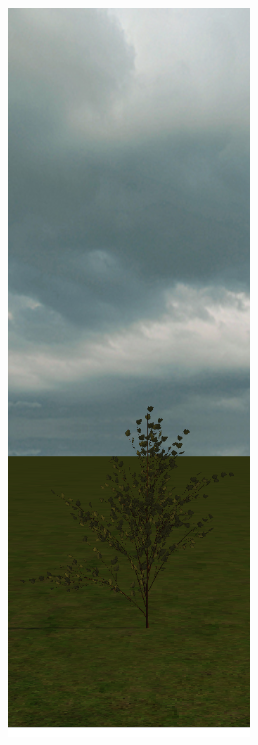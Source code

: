 \documentclass{article}
\begin{document}
  		\begin{figure}[ht!]
  			\includegraphics[scale=0.25]{treegrowth1}

\end{figure}
\end{document}

